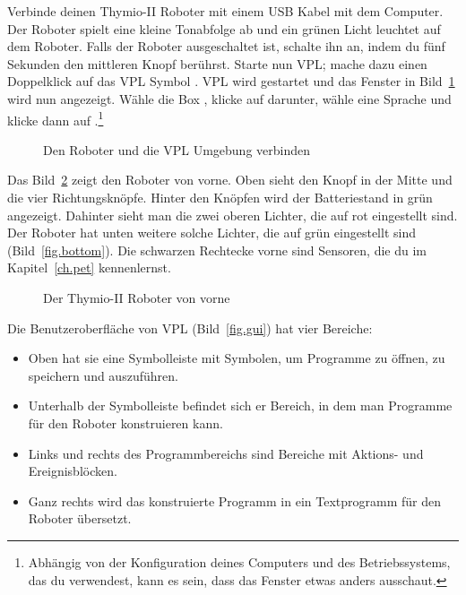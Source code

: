 

Verbinde deinen Thymio-II Roboter mit einem USB Kabel mit dem Computer. Der
Roboter spielt eine kleine Tonabfolge ab und  ein grünen Licht leuchtet auf dem
Roboter. Falls der Roboter ausgeschaltet ist, schalte ihn an, indem du fünf
Sekunden den mittleren Knopf berührst. Starte nun VPL; mache dazu einen
Doppelklick auf das VPL Symbol . VPL wird gestartet und das
Fenster in Bild~\ref{fig.connect} wird nun angezeigt. Wähle die Box
, klicke auf  darunter, wähle eine
Sprache und klicke dann auf .\footnote{Abhängig von der
Konfiguration deines Computers und des Betriebssystems, das du verwendest, kann es
sein, dass das Fenster etwas anders ausschaut.}


\begin{figure}
\begin{center}
\caption{Den Roboter und die VPL Umgebung verbinden}\label{fig.connect}
\end{center}
\end{figure} 


Das Bild~\ref{fig.front} zeigt den Roboter von vorne. Oben sieht den Knopf in
der Mitte und die vier Richtungsknöpfe. Hinter den Knöpfen wird der
Batteriestand in grün angezeigt. Dahinter sieht man die zwei oberen Lichter, die auf
rot eingestellt sind. Der Roboter hat unten weitere solche Lichter, die auf
grün eingestellt sind (Bild~\ref{fig.bottom}). Die schwarzen Rechtecke vorne
sind Sensoren, die du im Kapitel~\ref{ch.pet} kennenlernst.

\begin{figure}
\begin{center}
\caption{Der Thymio-II Roboter von vorne}\label{fig.front}
\end{center}
\end{figure} 

\clearpage


Die Benutzeroberfläche von VPL (Bild~\ref{fig.gui}) hat vier Bereiche:

\begin{itemize}
\item Oben hat sie eine Symbolleiste mit Symbolen, um Programme zu öffnen, zu
    speichern und auszuführen.
\item Unterhalb der Symbolleiste befindet sich er Bereich, in dem man Programme 
    für den Roboter konstruieren kann.
\item Links und rechts des Programmbereichs sind Bereiche mit Aktions- und
    Ereignisblöcken.
\item Ganz rechts wird das konstruierte Programm in ein Textprogramm für den
    Roboter übersetzt.
\end{itemize}

